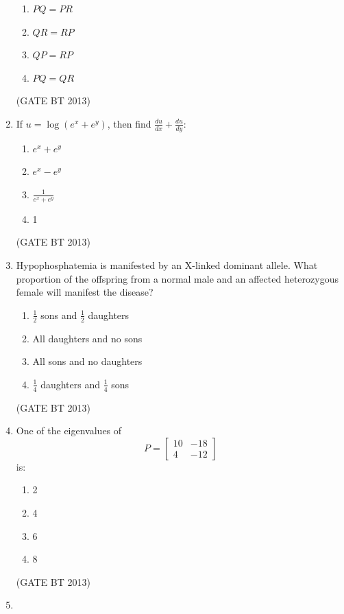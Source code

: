 \documentclass[journal,12pt,onecolumn]{IEEEtran}
\theoremstyle{remark}
\begin{document}
\begin{enumerate}
\begin{enumerate}[label=(\Alph*)]
    \item $PQ = PR$
    \item $QR = RP$
    \item $QP = RP$
    \item $PQ = QR$
\end{enumerate}
\hfill (GATE BT 2013)
\item 

If \( u = \log \left( e^{x} + e^{y} \right) \), then find \( \frac{du}{dx} + \frac{du}{dy} \):

\begin{enumerate}[label=(\Alph*)]
    \item $e^{x} + e^{y}$
    \item $e^{x} - e^{y}$
    \item\( \frac{1}{e^x + e^y} \)
    \item 1
\end{enumerate} 
\hfill (GATE BT 2013)
\item 

Hypophosphatemia is manifested by an X-linked dominant allele. What proportion of the offspring from a normal male and an affected heterozygous female will manifest the disease?

\begin{enumerate}[label=(\Alph*)]
    \item $\frac{1}{2}$ sons and $\frac{1}{2}$ daughters
    \item All daughters and no sons
    \item All sons and no daughters
    \item $\frac{1}{4}$ daughters and $\frac{1}{4}$ sons
\end{enumerate} 
\hfill (GATE BT 2013)
\item 

One of the eigenvalues of 
\[
P = \begin{bmatrix}
10 & -18 \\
4 & -12
\end{bmatrix}
\]
is:

\begin{enumerate}[label=(\Alph*)]
    \item 2
    \item 4
    \item 6
    \item 8
\end{enumerate} 
\hfill (GATE BT 2013)
\item 


\end{enumerate}
\end{document}
